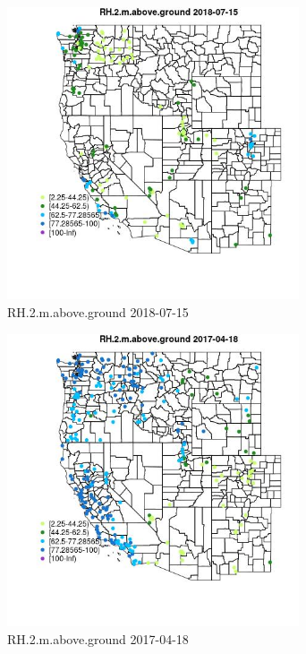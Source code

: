 \begin{figure} 
\centering  
\includegraphics[width=0.77\textwidth]{Code_Outputs/Report_ML_input_PM25_Step4_part_e_de_duplicated_aves_compiled_2019-05-20wNAs_MapObsRH2maboveground2018-07-15.jpg} 
\caption{\label{fig:Report_ML_input_PM25_Step4_part_e_de_duplicated_aves_compiled_2019-05-20wNAsMapObsRH2maboveground2018-07-15}RH.2.m.above.ground 2018-07-15} 
\end{figure} 
 

\begin{figure} 
\centering  
\includegraphics[width=0.77\textwidth]{Code_Outputs/Report_ML_input_PM25_Step4_part_e_de_duplicated_aves_compiled_2019-05-20wNAs_MapObsRH2maboveground2017-04-18.jpg} 
\caption{\label{fig:Report_ML_input_PM25_Step4_part_e_de_duplicated_aves_compiled_2019-05-20wNAsMapObsRH2maboveground2017-04-18}RH.2.m.above.ground 2017-04-18} 
\end{figure} 
 


